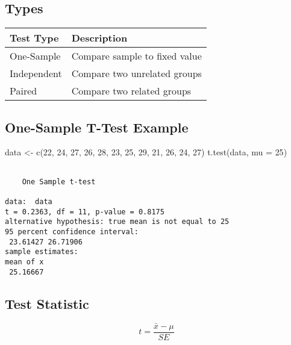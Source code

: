 \documentclass[
  letterpaper,
  DIV=11,
  numbers=noendperiod]{scrreprt}
\newenvironment{Shaded}{\begin{snugshade}}{\end{snugshade}}
\newcommand{\AttributeTok}[1]{\textcolor[rgb]{0.40,0.45,0.13}{#1}}
\newcommand{\DecValTok}[1]{\textcolor[rgb]{0.68,0.00,0.00}{#1}}
\newcommand{\FunctionTok}[1]{\textcolor[rgb]{0.28,0.35,0.67}{#1}}
\newcommand{\NormalTok}[1]{\textcolor[rgb]{0.00,0.23,0.31}{#1}}
\newcommand{\OtherTok}[1]{\textcolor[rgb]{0.00,0.23,0.31}{#1}}
\begin{document}
\subsection{Types}\label{types}

\begin{longtable}[]{@{}ll@{}}
\toprule\noalign{}
Test Type & Description \\
\midrule\noalign{}
\endhead
\bottomrule\noalign{}
\endlastfoot
One-Sample & Compare sample to fixed value \\
Independent & Compare two unrelated groups \\
Paired & Compare two related groups \\
\end{longtable}

\subsection{One-Sample T-Test Example}\label{one-sample-t-test-example}

\begin{Shaded}
\begin{Highlighting}[]
\NormalTok{data }\OtherTok{\textless{}{-}} \FunctionTok{c}\NormalTok{(}\DecValTok{22}\NormalTok{, }\DecValTok{24}\NormalTok{, }\DecValTok{27}\NormalTok{, }\DecValTok{26}\NormalTok{, }\DecValTok{28}\NormalTok{, }\DecValTok{23}\NormalTok{, }\DecValTok{25}\NormalTok{, }\DecValTok{29}\NormalTok{, }\DecValTok{21}\NormalTok{, }\DecValTok{26}\NormalTok{, }\DecValTok{24}\NormalTok{, }\DecValTok{27}\NormalTok{)}
\FunctionTok{t.test}\NormalTok{(data, }\AttributeTok{mu =} \DecValTok{25}\NormalTok{)}
\end{Highlighting}
\end{Shaded}

\begin{verbatim}

    One Sample t-test

data:  data
t = 0.2363, df = 11, p-value = 0.8175
alternative hypothesis: true mean is not equal to 25
95 percent confidence interval:
 23.61427 26.71906
sample estimates:
mean of x 
 25.16667 
\end{verbatim}

\subsection{Test Statistic}\label{test-statistic}

\[
t = \frac{\bar{x} - \mu}{SE}
\]
\end{document}
